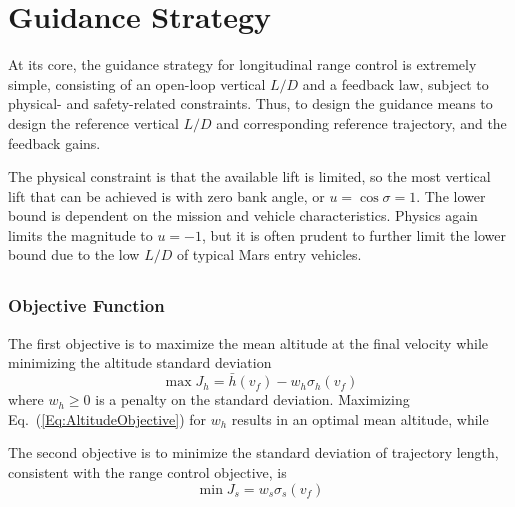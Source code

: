 \chapter{Guidance Strategy}
At its core, the guidance strategy for longitudinal range control is extremely simple, consisting of an open-loop vertical $L/D$ and a feedback law, subject to physical- and safety-related constraints. Thus, to design the guidance means to design the reference vertical $L/D$ and corresponding reference trajectory, and the feedback gains. 

The physical constraint is that the available lift is limited, so the most vertical lift that can be achieved is with zero bank angle, or $u=\cos\sigma=1$. The lower bound is dependent on the mission and vehicle characteristics. Physics again limits the magnitude to $u=-1$, but it is often prudent to further limit the lower bound due to the low $L/D$ of typical Mars entry vehicles.

\section{}
\subsection{Objective Function}
The first objective is to maximize the mean altitude at the final velocity while minimizing the altitude standard deviation
\begin{equation}
	\max J_h = \bar{h}(v_f) - w_h\sigma_h(v_f) \label{Eq:AltitudeObjective}
\end{equation}
where $w_h\ge0$ is a penalty on the standard deviation. Maximizing Eq.~(\ref{Eq:AltitudeObjective}) for $w_h$ results in an optimal mean altitude, while 

The second objective is to minimize the standard deviation of trajectory length, consistent with the range control objective, is 
\begin{equation}
	\min J_s = w_s\sigma_s(v_f) \label{Eq:RangeObjective}
\end{equation}

\section{}

